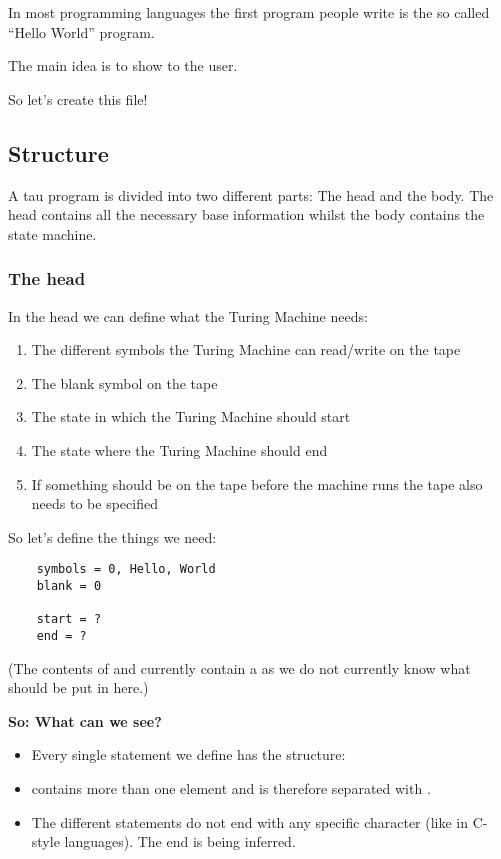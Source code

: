 In most programming languages the first program people write is the so called ``Hello World'' program.

The main idea is to show  to the user.

\vspace{0.5em}

So let's create this  file!

\subsection{Structure}
A tau program is divided into two different parts: The head and the body. 
The head contains all the necessary base information whilst the body contains the state machine.

\subsubsection{The head}
In the head we can define what the Turing Machine needs:
\begin{enumerate}
    \item The different symbols the Turing Machine can read/write on the tape
    \item The blank symbol on the tape
    \item The state in which the Turing Machine should start
    \item The state where the Turing Machine should end
    \item If something should be on the tape before the machine runs the tape also needs to be specified
\end{enumerate}

So let's define the things we need:
\begin{verbatim}
    symbols = 0, Hello, World
    blank = 0

    start = ?
    end = ?
\end{verbatim}
(The contents of  and  currently contain a  as we do not currently know what should be put in here.)

\vspace{0.8em}

\textbf{So: What can we see?}
\begin{itemize}
    \item Every single statement we define has the structure: 
    \begin{center}
    \end{center}
    \item {} contains more than one element and is therefore separated with \code{,}.
    \item The different statements do not end with any specific character (like \code{;} in C-style languages).
          The end is being inferred.
\end{itemize}

